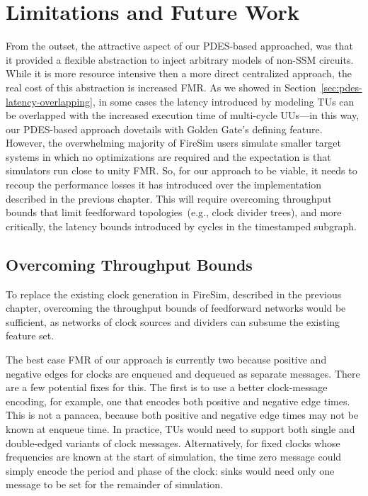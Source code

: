 \section{Limitations and Future Work}\label{sec:pdes-future-work}

From the outset, the attractive aspect of our PDES-based approached, was that
it provided a flexible abstraction to inject arbitrary models of non-SSM
circuits. While it is more resource intensive then a more direct centralized approach, the
real cost of this abstraction is increased FMR.  As we showed in Section~\ref{sec:pdes-latency-overlapping}, in
some cases the latency introduced by modeling TUs can be overlapped
with the increased execution time of multi-cycle UUs---in this way, our PDES-based
approach dovetails with Golden Gate's defining feature. However, the overwhelming majority of FireSim users simulate smaller target
systems in which no optimizations are required and the expectation is that
simulators run close to unity FMR. So, for our approach to be viable, it needs to recoup the performance
losses it has introduced over the implementation described in the previous
chapter. This will require overcoming throughput bounds
that limit feedforward topologies~(e.g., clock divider trees), and more critically, the latency bounds introduced by cycles in
the timestamped subgraph.

\subsection{Overcoming Throughput Bounds}
To replace the existing clock generation in FireSim, described in the previous chapter, overcoming the
throughput bounds of feedforward networks would be sufficient, as networks of clock
sources and dividers can subsume the existing feature set.

The best case FMR of our approach is currently two because positive and
negative edges for clocks are enqueued and dequeued as separate messages. There
are a few potential fixes for this. The first is to use a better clock-message
encoding, for example, one that encodes both positive and negative edge times. This is not a panacea, because both
positive and negative edge times may not be known at enqueue time. In practice,
TUs would need to support both single and double-edged variants of clock
messages. Alternatively, for fixed clocks whose frequencies are known at the start of simulation, the
time zero message could simply encode the period and phase of the clock:
sinks would need only one message to be set for the remainder of simulation.

